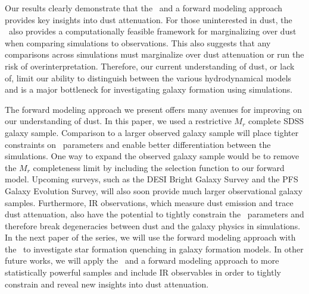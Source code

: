 Our results clearly demonstrate that the \eda~and a forward modeling approach
provides key insights into dust attenuation. For those uninterested in dust,
the \eda~also provides a computationally feasible framework for marginalizing
over dust when comparing simulations to observations. 
This also suggests that any comparisons across simulations must marginalize
over dust attenuation or run the risk of overinterpretation. 
Therefore, our current understanding of dust, or lack of, limit our ability to
distinguish between the various hydrodynamical models and is a major bottleneck
for investigating galaxy formation using simulations.

The forward modeling approach we present offers many avenues for improving on
our understanding of dust. In this paper, we used a restrictive 
$M_r$ complete SDSS galaxy sample. Comparison to a larger observed galaxy
sample will place tighter constraints on \eda~parameters and enable better
differentiation between the simulations. One way to expand the observed galaxy
sample would be to remove the $M_r$ completeness limit by including the
selection function to our forward model. Upcoming surveys, such as the DESI
Bright Galaxy Survey and the PFS Galaxy Evolution Survey, will also soon
provide much larger observational galaxy samples. Furthermore, IR observations,
which measure dust emission and trace dust attenuation, also have the potential
to tightly constrain the \eda~parameters and therefore break degeneracies
between dust and the galaxy physics in simulations. 
In the next paper of the series, we will use the forward modeling approach
with the \eda~to investigate star formation quenching in galaxy formation
models. 
In other future works, we will apply the \eda~and a forward modeling approach
to more statistically powerful samples and include IR observables in order to
tightly constrain and reveal new insights into dust attenuation. 
